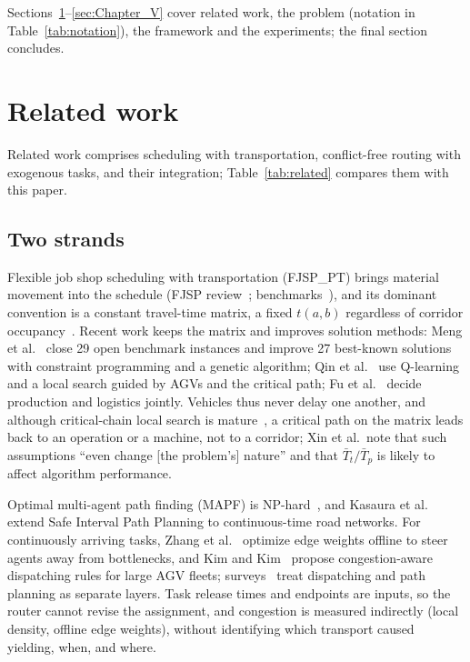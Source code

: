 Sections~\ref{sec:Chapter_II}--\ref{sec:Chapter_V} cover related work, the problem (notation in Table~\ref{tab:notation}), the framework and the experiments; the final section concludes.


\section{Related work}
\label{sec:Chapter_II}

Related work comprises scheduling with transportation, conflict-free routing with exogenous tasks, and their integration; Table~\ref{tab:related} compares them with this paper.

\subsection{Two strands}

Flexible job shop scheduling with transportation (FJSP\_PT) brings material movement into the schedule (FJSP review~\cite{dauzereperes2024fjsp}; benchmarks~\cite{homayouni2021production}), and its dominant convention is a constant travel-time matrix, a fixed $t(a,b)$ regardless of corridor occupancy~\cite{xin2025review}.
Recent work keeps the matrix and improves solution methods: Meng et al.~\cite{meng2025cp} close 29 open benchmark instances and improve 27 best-known solutions with constraint programming and a genetic algorithm; Qin et al.~\cite{qin2026knowledge} use Q-learning and a local search guided by AGVs and the critical path; Fu et al.~\cite{fu2025integrated} decide production and logistics jointly.
Vehicles thus never delay one another, and although critical-chain local search is mature~\cite{otala2021graph,tamssaouet2023neighborhood}, a critical path on the matrix leads back to an operation or a machine, not to a corridor; Xin et al.\ note that such assumptions ``even change [the problem's] nature'' and that $\bar{T}_t/\bar{T}_p$ is likely to affect algorithm performance.

Optimal multi-agent path finding (MAPF) is NP-hard~\cite{gao2023mapf}, and Kasaura et al.~\cite{kasaura2022sipp} extend Safe Interval Path Planning to continuous-time road networks.
For continuously arriving tasks, Zhang et al.~\cite{zhang2024guidance} optimize edge weights offline to steer agents away from bottlenecks, and Kim and Kim~\cite{kim2026congestion} propose congestion-aware dispatching rules for large AGV fleets; surveys~\cite{lu2022agv,fragapane2021planning} treat dispatching and path planning as separate layers.
Task release times and endpoints are inputs, so the router cannot revise the assignment, and congestion is measured indirectly (local density, offline edge weights), without identifying which transport caused yielding, when, and where.

